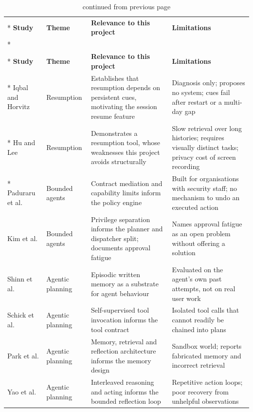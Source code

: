 \documentclass{FastFyp}
\begin{document}
{\small
{}
\begin{longtable}{|p{2.6cm}|p{2.0cm}|p{3.6cm}|p{4.6cm}|}
\caption{Summary of the reviewed literature.}\label{tab:lr}\\*
\hline
\textbf{Study} & \textbf{Theme} & \textbf{Relevance to this project} & \textbf{Limitations} \\*
\hline
\endfirsthead
\caption[]{continued from previous page}\\*
\hline
\textbf{Study} & \textbf{Theme} & \textbf{Relevance to this project} & \textbf{Limitations} \\*
\hline
\endhead
\hline
Iqbal and Horvitz \cite{ref:iqbal2007} & Resumption & Establishes that resumption depends on persistent cues, motivating the session resume feature & Diagnosis only; proposes no system; cues fail after restart or a multi-day gap \\*
\hline
Hu and Lee \cite{ref:hu2020} & Resumption & Demonstrates a resumption tool, whose weaknesses this project avoids structurally & Slow retrieval over long histories; requires visually distinct tasks; privacy cost of screen recording \\*
\hline
Paduraru et al. \cite{ref:paduraru2026} & Bounded agents & Contract mediation and capability limits inform the policy engine & Built for organisations with security staff; no mechanism to undo an executed action \\
\hline
Kim et al. \cite{ref:kim2026} & Bounded agents & Privilege separation informs the planner and dispatcher split; documents approval fatigue & Names approval fatigue as an open problem without offering a solution \\
\hline
Shinn et al. \cite{ref:shinn2023} & Agentic planning & Episodic written memory as a substrate for agent behaviour & Evaluated on the agent's own past attempts, not on real user work \\
\hline
Schick et al. \cite{ref:schick2023} & Agentic planning & Self-supervised tool invocation informs the tool contract & Isolated tool calls that cannot readily be chained into plans \\
\hline
Park et al. \cite{ref:park2023} & Agentic planning & Memory, retrieval and reflection architecture informs the memory design & Sandbox world; reports fabricated memory and incorrect retrieval \\
\hline
Yao et al. \cite{ref:yao2023react} & Agentic planning & Interleaved reasoning and acting informs the bounded reflection loop & Repetitive action loops; poor recovery from unhelpful observations \\

\end{longtable}}
\end{document}
